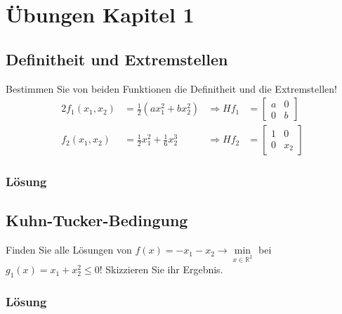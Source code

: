 \section*{Übungen Kapitel 1}
\label{sec:uebung_kapitel_1}

\subsection*{Definitheit und Extremstellen}
\label{sec:uebung_kapitel_1_def_extrem} 
Bestimmen Sie von beiden Funktionen die Definitheit und die Extremstellen!
\begin{alignat*}{2}
f_1(x_1,x_2) & = \frac12\left(ax_1^2+bx_2^2\right) &\Rightarrow H f_1&=\begin{bmatrix} a & 0\\ 0 & b \end{bmatrix}\\
f_2(x_1,x_2) & = \frac12x_1^2+\frac16x_2^3 & \Rightarrow H f_2&=\begin{bmatrix} 1 & 0\\ 0 & x_2 \end{bmatrix}
\end{alignat*}

\subsubsection{Lösung}
 
\subsection*{Kuhn-Tucker-Bedingung}
\label{sec:uebung_kapitel_1_ktb} 
Finden Sie alle Lösungen von $f(x)=-x_1-x_2\rightarrow\min\limits_{x\in\mathbb{R}^2}$ bei $g_1(x)=x_1+x_2^2\le 0$! Skizzieren Sie ihr Ergebnis.

\subsubsection{Lösung} 

